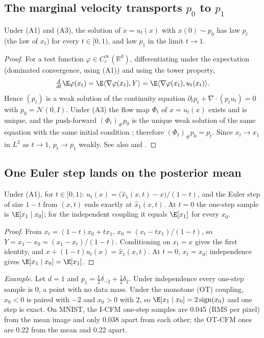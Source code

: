 \subsection{The marginal velocity transports $p_0$ to $p_1$}\label{app:d2}
\begin{proposition}\label{prop:transport}
Under (A1) and (A3), the solution of $\dot x=u_t(x)$ with $x(0)\sim p_0$ has law $p_t$ (the law of $x_t$) for every $t\in[0,1)$, and law $p_1$ in the limit $t\to1$.
\end{proposition}
\begin{proof}
For a test function $\varphi\in C_c^\infty(\mathbb R^d)$, differentiating under the expectation (dominated convergence, using (A1)) and using the tower property,
\[
\tfrac{d}{dt}\E\varphi(x_t)=\E\langle\nabla\varphi(x_t),Y\rangle=\E\langle\nabla\varphi(x_t),u_t(x_t)\rangle .
\]
Hence $(p_t)$ is a weak solution of the continuity equation $\partial_tp_t+\nabla\cdot(p_tu_t)=0$ with $p_0=\mathcal N(0,I)$. Under (A3) the flow map $\Phi_t$ of $\dot x=u_t(x)$ exists and is unique, and the push-forward $(\Phi_t)_\#p_0$ is the unique weak solution of the same equation with the same initial condition \citep[Ch.~1 and~5]{villani2009ot}; therefore $(\Phi_t)_\#p_0=p_t$. Since $x_t\to x_1$ in $L^2$ as $t\to1$, $p_t\to p_1$ weakly. See also \citet[Theorem~1]{lipman2023fm} and \citet[Theorem~3.3]{liu2023rf}.
\end{proof}

\subsection{One Euler step lands on the posterior mean}\label{app:d3}
\begin{proposition}\label{prop:onestep}
Under (A1), for $t\in[0,1)$: $u_t(x)=\big(\hat x_1(x,t)-x\big)/(1-t)$, and the Euler step of size $1-t$ from $(x,t)$ ends exactly at $\hat x_1(x,t)$. At $t=0$ the one-step sample is $\E[x_1\mid x_0]$; for the independent coupling it equals $\E[x_1]$ for every $x_0$.
\end{proposition}
\begin{proof}
From $x_t=(1-t)x_0+tx_1$, $x_0=(x_t-tx_1)/(1-t)$, so $Y=x_1-x_0=(x_1-x_t)/(1-t)$. Conditioning on $x_t=x$ gives the first identity, and $x+(1-t)u_t(x)=\hat x_1(x,t)$. At $t=0$, $x_t=x_0$; independence gives $\E[x_1\mid x_0]=\E[x_1]$.
\end{proof}
\emph{Example.} Let $d=1$ and $p_1=\tfrac12\delta_{-2}+\tfrac12\delta_{2}$. Under independence every one-step sample is $0$, a point with no data mass. Under the monotone (OT) coupling, $x_0<0$ is paired with $-2$ and $x_0>0$ with $2$, so $\E[x_1\mid x_0]=2\,\mathrm{sign}(x_0)$ and one step is exact. On MNIST, the I-CFM one-step samples are 0.045 (RMS per pixel) from the mean image and only 0.038 apart from each other; the OT-CFM ones are 0.22 from the mean and 0.22 apart. %

